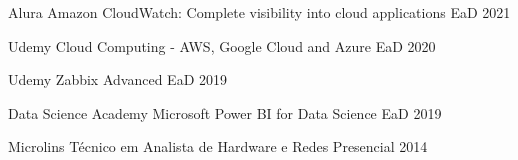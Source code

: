 \begin{cvhonors}
  \cvhonor
    {Alura} %
    {Amazon CloudWatch: Complete visibility into cloud applications} %
    {EaD} %
    {2021} %

  \cvhonor
    {Udemy} %
    {Cloud Computing - AWS, Google Cloud and Azure} %
    {EaD} %
    {2020} %

  \cvhonor
    {Udemy} %
    {Zabbix Advanced} %
    {EaD} %
    {2019} %

  \cvhonor
    {Data Science Academy} %
    {Microsoft Power BI for Data Science} %
    {EaD} %
    {2019} %

  \cvhonor
    {Microlins} %
    {Técnico em Analista de Hardware e Redes} %
    {Presencial} %
    {2014} %
\end{cvhonors}
